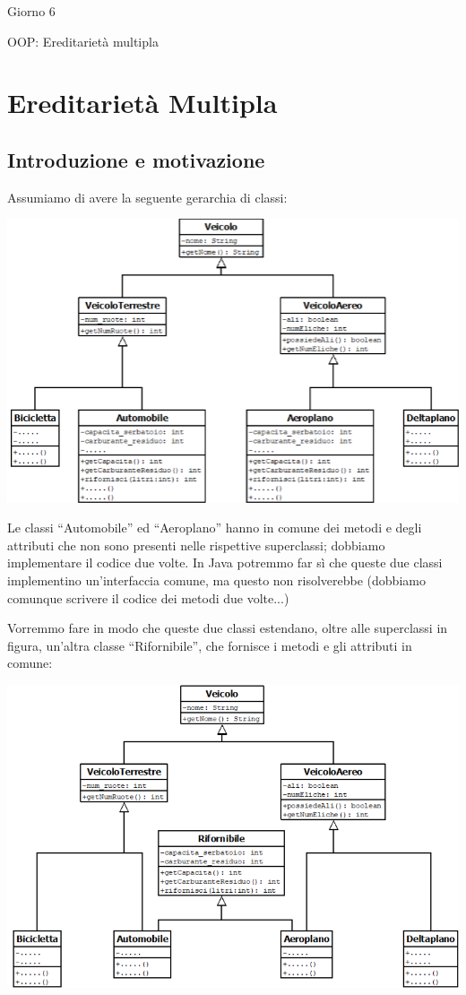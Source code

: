 \documentclass[a4paper,10pt]{article}
\begin{document}
\begin{center}
    \LARGE Giorno 6\smallskip

    \Large OOP: Ereditarietà multipla
\end{center}\smallskip

\section{Ereditarietà Multipla}
\subsection{Introduzione e motivazione}
Assumiamo di avere la seguente gerarchia di classi:
\begin{center} 
\includegraphics[scale=.5]{mult}
\end{center}

Le classi ``Automobile'' ed ``Aeroplano'' hanno in comune dei metodi  e degli attributi che non sono presenti nelle rispettive superclassi; dobbiamo implementare il codice due volte. In Java potremmo far sì che queste due classi implementino un'interfaccia comune, ma questo non risolverebbe (dobbiamo comunque scrivere il codice dei metodi due volte...)\smallskip

Vorremmo fare in modo che queste due classi estendano, oltre alle superclassi in figura, un'altra classe ``Rifornibile'', che fornisce i metodi e gli attributi in comune:

\begin{center} 
\includegraphics[scale=.5]{mult2}
\end{center}
\end{document}

